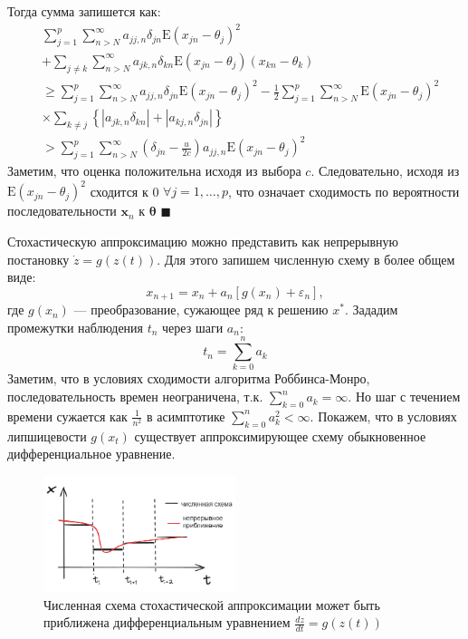Тогда сумма запишется как:
\begin{equation}
    \begin{aligned}
        & \sum_{j=1}^{p} \sum_{n>N}^{\infty} a_{j j, n} \delta_{j n} \mathrm{E}\left(x_{j n}-\theta_{j}\right)^{2} \\
        & +\sum_{j \neq k} \sum_{n>N}^{\infty} a_{j k, n} \delta_{k n} \mathrm{E}\left(x_{j n}-\theta_{j}\right)\left(x_{k n}-\theta_{k}\right) \\
        &  \geq \sum_{j=1}^{p} \sum_{n>N}^{\infty} a_{j j, n} \delta_{j n} \mathrm{E}\left(x_{j n}-\theta_{j}\right)^{2}-\frac{1}{2} \sum_{j=1}^{p} \sum_{n>N}^{\infty} \mathrm{E}\left(x_{j n}-\theta_{j}\right)^{2} \\
        &  \times \sum_{k \neq j}\left\{\left|a_{j k, n} \delta_{k n}\right|+\left|a_{k j, n} \delta_{j n}\right|\right\} \\
        & >\sum_{j=1}^{p} \sum_{n>N}^{\infty}\left(\delta_{j n}-\frac{u}{2 c}\right) a_{j j, n} \mathrm{E}\left(x_{j n}-\theta_{j}\right)^{2}
    \end{aligned}
\end{equation}
Заметим, что оценка положительна исходя из выбора $c$. Следовательно, исходя из $\mathrm{E}\left(x_{j n}-\theta_{j}\right)^{2}$ сходится к 0 $\forall j= 1, \ldots, p$,
что означает сходимость по вероятности последовательности $\mathbf{x}_{n}$ к $\boldsymbol{\theta}$
$\blacksquare$

Стохастическую аппроксимацию можно представить
как непрерывную постановку $\dot{z} = g(z(t))$. Для этого запишем численную схему в более общем виде:
\begin{equation}
    x_{n+1} = x_n + a_n \left[g(x_n) + \varepsilon_n \right],
\end{equation}
где $g(x_n)$ --- преобразование, сужающее ряд к решению $x^*$. Зададим промежутки наблюдения $t_n$ через шаги $a_n$:
\begin{equation}
    t_n = \sum_{k=0}^n a_k 
\end{equation}
Заметим, что в условиях сходимости алгоритма Роббинса-Монро, последовательность времен неограничена, 
т.к. $\sum_{k=0}^n a_k =\infty$.
Но шаг с течением времени сужается как $\frac{1}{n^2}$ в асимптотике $\sum_{k=0}^n a^2_k < \infty$. 
Покажем, что в условиях липшицевости $g(x_t)$ существует аппроксимирующее схему обыкновенное дифференциальное уравнение.

\begin{figure}[h]
    \centering
    \includegraphics[width=0.5\textwidth]{assets/math/approx/cont_vs_discrete.excalidraw.png}
    \caption{Численная схема стохастической аппроксимации может быть приближена дифференциальным уравнением $\frac{d z}{d t} = g(z(t))$ }
    \label{continuiation}
\end{figure}

